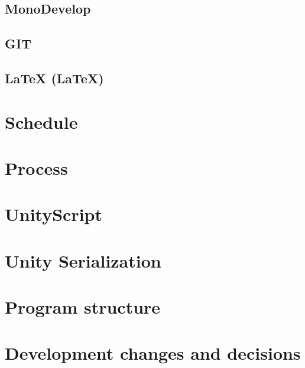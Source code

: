 \documentclass[BSP,english,oneside]{classes/gucthesis}
\begin{document}
		\section{MonoDevelop}
			\label{chap:monodevelop}
			

		\section{GIT}
			\label{chap:git}
			

		\section{LaTeX (\LaTeX)}
			\label{chap:latex}
			


	\chapter{Schedule}
		\label{chap:schedule}
		

	\chapter{Process}
		\label{chap:process}
		

	\chapter{UnityScript}
		\label{chap:UnityScript}
		

	\chapter{Unity Serialization}
		\label{chap:UnitySerialization}
		

	\chapter{Program structure}
		\label{chap:program_structure}
		

	\chapter{Development changes and decisions}
		\label{chap:Developmentchangesanddecisions}
		
\end{document}
